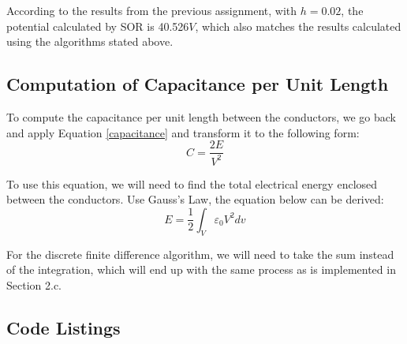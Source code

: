 \documentclass[a4paper,titlepage]{article}
\newcommand{\MATLAB}{\textsc{Matlab}\xspace}
\begin{document}
				According to the results from the previous assignment, with $h = 0.02$, the potential calculated by SOR is 40.526$V$, which also matches the results calculated using the algorithms stated above. 
			\subsection{Computation of Capacitance per Unit Length}
				To compute the capacitance per unit length between the conductors, we go back and apply Equation \ref{capacitance} and transform it to the following form:
				$$
					C = \frac{2E}{V^2}
				$$
				
				To use this equation, we will need to find the total electrical energy enclosed between the conductors. Use Gauss's Law, the equation below can be derived:
				\begin{equation}
					E = \frac{1}{2} \int_{V} \varepsilon_0V^2dv
				\end{equation}
				
				For the discrete finite difference algorithm, we will need to 
				take the sum instead of the integration, which will end up with the same process as is implemented in Section 2.c.
	\newpage
	\begin{appendices}
		
		\section{Code Listings} \label{appendix:code}
		
		
		\begin{center}
			\inputminted{python}{../finite_element.py}
			\label{lst:finite_element}
		\end{center}
		
		\newpage
		\twocolumn
		\begin{center}
			\inputminted{python}{../SIMPLE2Dinput.dat}
			\label{lst:SIMPLE2D.dat}
		\end{center}
	
		\begin{center}
			\captionof{listing}{\MATLAB File Outputs}
			\inputminted{python}{../potentials.dat}
			\label{lst:potential.dat}
		\end{center}
		\newpage
		
		\onecolumn
		\begin{center}
			\inputminted{python}{../conjugate_gradient.py}
			\label{lst:conjugate_gradient}
		\end{center}
		\begin{center}
			\inputminted{python}{../choleski.py}
			\label{lst:chol}
		\end{center}
	\end{appendices}
	
\end{document}

